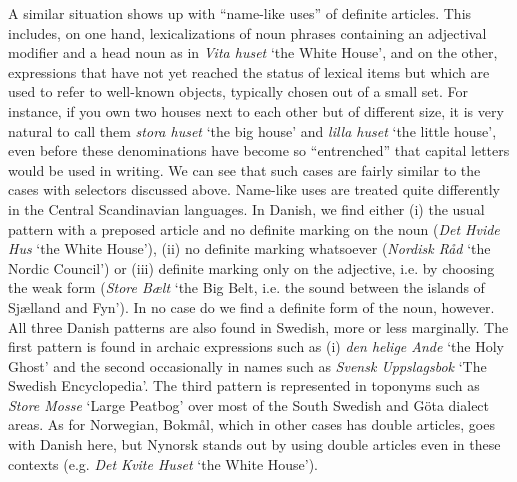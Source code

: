 \begin{styleBodyTextFirst}
A similar situation shows up with “name-like uses” of definite articles. This includes, on one hand, lexicalizations of noun phrases containing an adjectival modifier and a head noun as in \textit{Vita huset} ‘the White House’, and on the other, expressions that have not yet reached the status of lexical items but which are used to refer to well-known objects, typically chosen out of a small set. For instance, if you own two houses next to each other but of different size, it is very natural to call them \textit{stora huset} ‘the big house’ and \textit{lilla huset} ‘the little house’, even before these denominations have become so “entrenched” that capital letters would be used in writing. We can see that such cases are fairly similar to the cases with selectors discussed above. Name-like uses are treated quite differently in the Central Scandinavian languages. In Danish, we find either (i) the usual pattern with a preposed article and no definite marking on the noun (\textit{Det Hvide Hus} ‘the White House’), (ii) no definite marking whatsoever (\textit{Nordisk Råd} ‘the Nordic Council’) or (iii) definite marking only on the adjective, i.e. by choosing the weak form (\textit{Store Bælt} ‘the Big Belt, i.e. the sound between the islands of Sjælland and Fyn’). In no case do we find a definite form of the noun, however. All three Danish patterns are also found in Swedish, more or less marginally. The first pattern is found in archaic expressions such as (i) \textit{den helige Ande} ‘the Holy Ghost’ and the second occasionally in names such as  \textit{Svensk Uppslagsbok} ‘The Swedish Encyclopedia’. The third pattern is represented in toponyms such as \textit{Store Mosse} ‘Large Peatbog’ over most of the South Swedish and Göta dialect areas. As for Norwegian, Bokmål, which in other cases has double articles, goes with Danish here, but Nynorsk stands out by using double articles even in these contexts (e.g. \textit{Det Kvite Huset} ‘the White House’). 

\end{styleBodyTextFirst}

